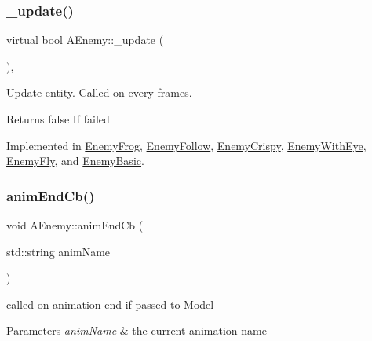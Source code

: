 \subsubsection{\texorpdfstring{\+\_\+update()}{\_update()}}
{\footnotesize\ttfamily virtual bool A\+Enemy\+::\+\_\+update (\begin{DoxyParamCaption}{ }\end{DoxyParamCaption})\hspace{0.3cm}{\ttfamily [protected]}, {}}



Update entity. Called on every frames. 

\begin{DoxyReturn}{Returns}
false If failed 
\end{DoxyReturn}


Implemented in \hyperlink{class_enemy_frog_a92b77b8686f21b8ef3ee3d1cb078a2d4}{Enemy\+Frog}, \hyperlink{class_enemy_follow_a056cb50efd0967fddc9975920c927741}{Enemy\+Follow}, \hyperlink{class_enemy_crispy_ad48755d398b40e0000806a89025802a1}{Enemy\+Crispy}, \hyperlink{class_enemy_with_eye_a3dff148a3aed8d67434111fd052f71c2}{Enemy\+With\+Eye}, \hyperlink{class_enemy_fly_a9b5577a848bba5d11e1d90cf923973ad}{Enemy\+Fly}, and \hyperlink{class_enemy_basic_a6b4c43308489726b95641ed9591bdb25}{Enemy\+Basic}.

\mbox{\label{class_a_enemy_ac946b6cd7d96f99365301450566d3baf}} 
\subsubsection{\texorpdfstring{anim\+End\+Cb()}{animEndCb()}}
{\footnotesize\ttfamily void A\+Enemy\+::anim\+End\+Cb (\begin{DoxyParamCaption}\item[{std\+::string}]{anim\+Name }\end{DoxyParamCaption})\hspace{0.3cm}{\ttfamily [virtual]}}



called on animation end if passed to \hyperlink{class_model}{Model} 


\begin{DoxyParams}{Parameters}
{\em anim\+Name} & the current animation name \\
\hline
\end{DoxyParams}


